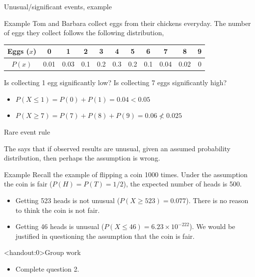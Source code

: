 \documentclass[xcolor=table, aspectratio=169, bigger]{beamer}
\begin{document}
\begin{frame}{Unusual/significant events, example}
\begin{exampleblock}{Example}
Tom and Barbara collect eggs from their chickens everyday. The number of eggs they collect follows the following distribution,\\
\smallskip
{\centering
\begin{tabular}{c|cccccccccc}
Eggs ($x$) & 0 & 1 & 2 & 3 & 4 & 5 & 6 & 7 & 8 & 9 \\
\hline
$P(x)$ & 0.01 & 0.03 & 0.1 & 0.2 & 0.3 & 0.2 & 0.1 & 0.04 & 0.02 & 0
\end{tabular}\par
}
\medskip
Is collecting 1 egg significantly low? Is collecting 7 eggs significantly high?
\begin{itemize}
\pause\item $P(X\le 1) = P(0) + P(1) = 0.04  < 0.05$\\
\pause\item $P(X \ge 7) = P(7) + P(8) + P(9) = 0.06 \not < 0.025$\\
\end{itemize}
\end{exampleblock}
\end{frame}

\begin{frame}{Rare event rule}
\begin{block}{}
The  says that if observed results are unusual, given an assumed probability distribution, then perhaps the assumption is wrong.
\end{block}
\pause
\begin{exampleblock}{Example}
Recall the example of flipping a coin 1000 times. Under the assumption the coin is fair ($P(H) = P(T) = 1/2$), the expected number of heads is 500.
\begin{itemize}
\pause\item Getting 523 heads is not unusual ($P(X \ge 523) = 0.077$). There is no reason to think the coin is not fair.
\pause\item Getting 46 heads is unusual ($P(X \le 46) = 6.23 \times 10^{-222}$). We would be justified in questioning the assumption that the coin is fair.
\end{itemize}
\end{exampleblock}
\end{frame}



\begin{frame}<handout:0>{Group work}
\begin{block}{}
\large
\begin{itemize}
\item Complete question 2.
\end{itemize}
\end{block}
\end{frame}
\end{document}
